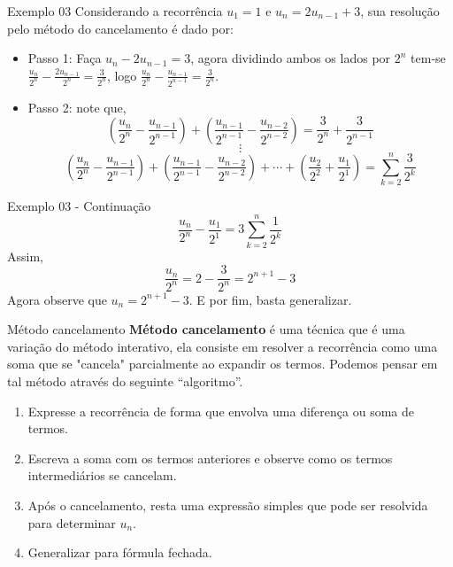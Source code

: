 \begin{frame}{Exemplo 03}
  Considerando a recorrência $u_1 = 1$ e $u_{n} = 2u_{n - 1} + 3$, sua resolução pelo método do cancelamento é dado por:
  \pause
  \begin{itemize}
    \item Passo 1: Faça $u_n - 2u_{n - 1} = 3$, agora dividindo ambos os lados por $2^n$ tem-se $\frac{u_n}{2^n}- \frac{2u_{n - 1}}{2^n} = \frac{3}{2^n}$, logo $\frac{u_n}{2^n}- \frac{u_{n - 1}}{2^{n-1}} = \frac{3}{2^n}$.
    \item Passo 2: note que,\pause
    $$(\frac{u_n}{2^n} - \frac{u_{n - 1}}{2^{n-1}}) + (\frac{u_{n - 1}}{2^{n-1}} - \frac{u_{n - 2}}{2^{n-2}})  = \frac{3}{2^n} + \frac{3}{2^{n-1}}$$\pause
    $$\vdots$$
    $$(\frac{u_n}{2^n} - \frac{u_{n - 1}}{2^{n-1}}) + (\frac{u_{n - 1}}{2^{n-1}} - \frac{u_{n - 2}}{2^{n-2}}) + \cdots + (\frac{u_2}{2^2} + \frac{u_1}{2^1}) = \sum_{k = 2}^{n}\frac{3}{2^k}$$
  \end{itemize}
\end{frame}

\begin{frame}{Exemplo 03 - Continuação}
  $$\frac{u_n}{2^n} - \frac{u_1}{2^1} = 3 \sum_{k = 2}^{n}\frac{1}{2^k}$$\pause
  Assim, 
  $$\frac{u_n}{2^n} = 2 - \frac{3}{2^n} = 2^{n+1} - 3$$\pause
  Agora observe que $u_n = 2^{n+1} - 3$. E por fim, basta generalizar.
\end{frame}


\begin{frame}{Método cancelamento}
  \textbf{Método cancelamento} é uma técnica que é uma variação do método interativo, ela consiste em resolver a recorrência como uma soma que se "cancela" parcialmente ao expandir os termos. Podemos pensar em tal método através do seguinte ``algoritmo''.
  \begin{enumerate}
    \item Expresse a recorrência de forma que envolva uma diferença ou soma de termos.
    \item Escreva a soma com os termos anteriores e observe como os termos intermediários se cancelam.
    \item Após o cancelamento, resta uma expressão simples que pode ser resolvida para determinar $u_n$.
    \item Generalizar para fórmula fechada.
  \end{enumerate}
\end{frame}